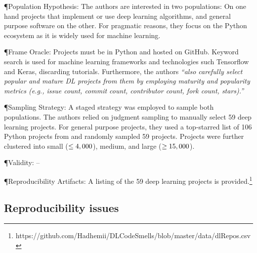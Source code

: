 \documentclass[sigconf,review,anonymous]{acmart}
\newcommand{\gh}{{GitHub}\xspace}
\begin{document}
\P{Population Hypothesis:} The authors are interested in two populations: On one
hand projects that implement or use deep learning algorithms, and general
purpose software on the other. For pragmatic reasons, they focus on the Python
ecosystem as it is widely used for machine learning.

\P{Frame Oracle:} Projects must be in Python and hosted on \gh. Keyword
search is used for machine learning frameworks and technologies such Tensorflow and
Keras, discarding tutorials. Furthermore, the authors \textit{``also carefully select
  popular and mature DL projects from them by employing maturity and popularity
  metrics (e.g., issue count, commit count, contributor count, fork count,
  stars).''}

\P{Sampling Strategy:} A staged strategy was employed to sample both
populations. The authors relied on judgment sampling to manually select 59 deep
learning projects. For general purpose projects, they used a top-starred list of
106 Python projects from \citet{Chen:2018:IST} and randomly sampled 59 projects.
Projects were further clustered into small ($\leq4,000$), medium, and
large ($\geq15,000$).

\P{Validity:} --

\P{Reproducibility Artifacts:}  A listing of the 59 deep learning projects is
provided.\footnote{https://github.com/Hadhemii/DLCodeSmells/blob/master/data/dlRepos.csv}

\newpage
\subsection{Reproducibility issues}
\end{document}
